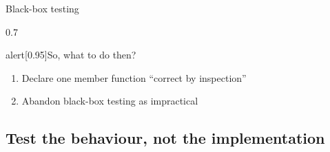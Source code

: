 \begin{frame}[fragile]{Black-box testing}
\begin{overlayarea}{\textwidth}{0.7\textheight}
\begin{varblock}{alert}[0.95\textwidth]{So, what to do then?}
\begin{enumerate}
                \item Declare one member function ``correct by inspection'' 
                \item Abandon black-box testing as impractical
            \end{enumerate}
        \end{varblock}
    \end{overlayarea}
\end{frame}


\subsection{Test the behaviour, not the implementation}
